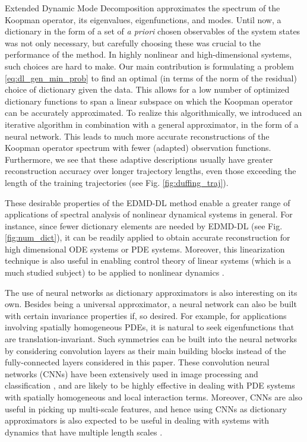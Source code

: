 \documentclass[%
 aip,
 cha,
 sd,%
 amsmath,amssymb,
 preprint,%
]{revtex4-1}
\begin{document}
Extended Dynamic Mode Decomposition approximates the spectrum of the Koopman operator, its eigenvalues, eigenfunctions, and modes. Until now, a dictionary in the form of a set of {\it a priori} chosen observables of the system states was not only necessary, but carefully choosing these was crucial to the performance of the method. In highly nonlinear and high-dimensional systems, such choices are hard to make. 
Our main contribution is formulating a problem \eqref{eq:dl_gen_min_prob} to find an optimal (in terms of the norm of the residual) choice of dictionary given the data. This allows for a low number of optimized dictionary functions to span a linear subspace on which the Koopman operator can be accurately approximated. To realize this algorithmically, we introduced an iterative algorithm in combination with a general approximator, in the form of a neural network. This leads to much more accurate reconstructions of the Koopman operator spectrum with fewer (adapted) observation functions. Furthermore, we see that these adaptive descriptions usually have greater reconstruction accuracy over longer trajectory lengths, even those exceeding the length of the training trajectories (see Fig. \ref{fig:duffing_traj}). 

These desirable properties of the EDMD-DL method enable a greater range of applications of spectral analysis of nonlinear dynamical systems in general. For instance, since fewer dictionary elements are needed by EDMD-DL (see Fig. \ref{fig:num_dict}), it can be readily applied to obtain accurate reconstruction for high dimensional ODE systems or PDE systems. Moreover, this linearization technique is also useful in enabling control theory of linear systems (which is a much studied subject) to be applied to nonlinear dynamics \cite{kwakernaak1972linear}. 

The use of neural networks as dictionary approximators is also interesting on its own. Besides being a universal approximator, a neural network can also be built with certain invariance properties if, so desired. For example, for applications involving spatially homogeneous PDEs, it is natural to seek eigenfunctions that are translation-invariant. Such symmetries can be built into the neural networks by considering convolution layers as their main building blocks instead of the fully-connected layers considered in this paper. These convolution neural networks (CNNs) have been extensively used in image processing and classification \cite{krizhevsky2012imagenet}, and are likely to be highly effective in dealing with PDE systems with spatially homogeneous and local interaction terms. Moreover, CNNs are also useful in picking up multi-scale features, and hence using CNNs as dictionary approximators is also expected to be useful in dealing with systems with dynamics that have multiple length scales \cite{lecun1995convolutional,lecun2010convolutional,krizhevsky2012imagenet,lecun2015deep}. 
\end{document}
